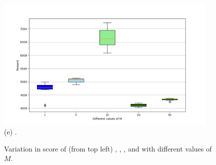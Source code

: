 \begin{figure}[hH]
    \begin{minipage}[b]{0.45\textwidth}
        \centering
        \includegraphics[width=0.95\textwidth]{figures/HalfCheetah-v1.png} \\
        (e) .
     \end{minipage}
    \caption{Variation in score of (from top left) , , ,  and  with different values of $M$.}
    \label{fig:boxplot}
\end{figure}


